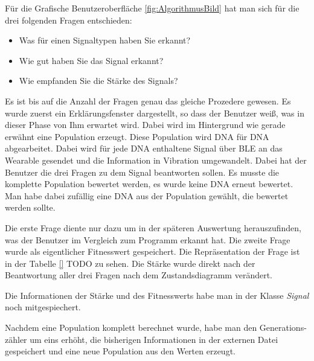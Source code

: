 F{\"u}r die Grafische Benutzeroberfl{\"a}che \autoref{fig:AlgorithmusBild} hat man sich f{\"u}r die drei folgenden Fragen entschieden:
\begin{itemize}
\item Was f{\"u}r einen Signaltypen haben Sie erkannt?
\item Wie gut haben Sie das Signal erkannt?
\item Wie empfanden Sie die St{\"a}rke des Signals?
\end{itemize}

Es ist bis auf die Anzahl der Fragen genau das gleiche Prozedere gewesen. Es wurde zuerst ein Erkl{\"a}rungsfenster dargestellt, so dass der Benutzer wei{\ss}, was in dieser Phase von Ihm erwartet wird. 
Dabei wird im Hintergrund wie gerade erw{\"a}hnt eine Population erzeugt. Diese Population wird DNA f{\"u}r DNA abgearbeitet. Dabei wird f{\"u}r jede DNA enthaltene Signal {\"u}ber BLE an das Wearable gesendet und die Information in Vibration umgewandelt. Dabei hat der Benutzer die drei Fragen zu dem Signal beantworten sollen. 
Es musste die komplette Population bewertet werden, es wurde keine DNA erneut bewertet. Man habe dabei zuf{\"a}llig eine DNA aus der Population gew{\"a}hlt, die bewertet werden sollte.

Die erste Frage diente nur dazu um in der sp{\"a}teren Auswertung herauszufinden, was der Benutzer im Vergleich zum Programm erkannt hat. 
Die zweite Frage wurde als eigentlicher Fitnesswert gespeichert. Die Repr{\"a}sentation der Frage ist in der Tabelle \autoref{} TODO zu sehen.
Die St{\"a}rke wurde direkt nach der Beantwortung aller drei Fragen nach dem Zustandsdiagramm ver{\"a}ndert.

Die Informationen der St{\"a}rke und des Fitnesswerts habe man in der Klasse \textit{Signal} noch mitgespiechert.

Nachdem eine Population komplett berechnet wurde, habe man den Generations-z{\"a}hler um eins erh{\"o}ht, die bisherigen Informationen in der externen Datei gespeichert und eine neue Population aus den Werten erzeugt.

